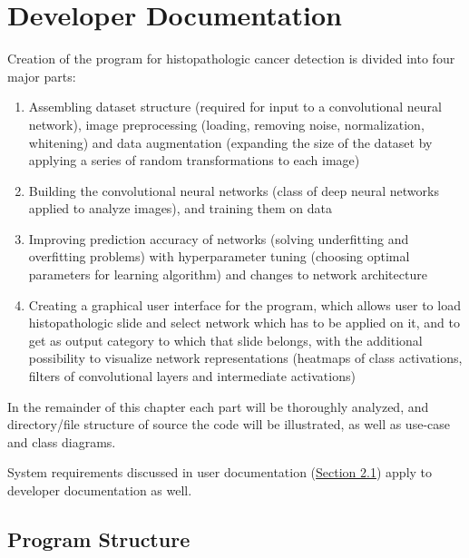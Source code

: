 \chapter{Developer Documentation}
\label{ch:impl}

Creation of the program for histopathologic cancer detection is divided into four major parts:
\begin{enumerate}
	\itemsep0em
	\item Assembling dataset structure (required for input to a convolutional neural network), image preprocessing (loading, removing noise, normalization, whitening) and data augmentation (expanding the size of the dataset by applying a series of random transformations to each image)
	\item Building the convolutional neural networks (class of deep neural networks applied to analyze images), and training them on data
	\item Improving prediction accuracy of networks (solving underfitting and overfitting problems) with hyperparameter tuning (choosing optimal parameters for learning algorithm) and changes to network architecture
	\item Creating a graphical user interface for the program, which allows user to load histopathologic slide and select network which has to be applied on it, and to get as output category to which that slide belongs, with the additional possibility to visualize network representations (heatmaps of class activations, filters of convolutional layers and intermediate activations)
\end{enumerate}
In the remainder of this chapter each part will be thoroughly analyzed, and directory/file structure of source the code will be illustrated, as well as use-case and class diagrams. 

System requirements discussed in user documentation (\textcolor{red}{\hyperref[sysreq]{Section 2.1}}) apply to developer documentation as well. 
\clearpage

\section{Program Structure}

